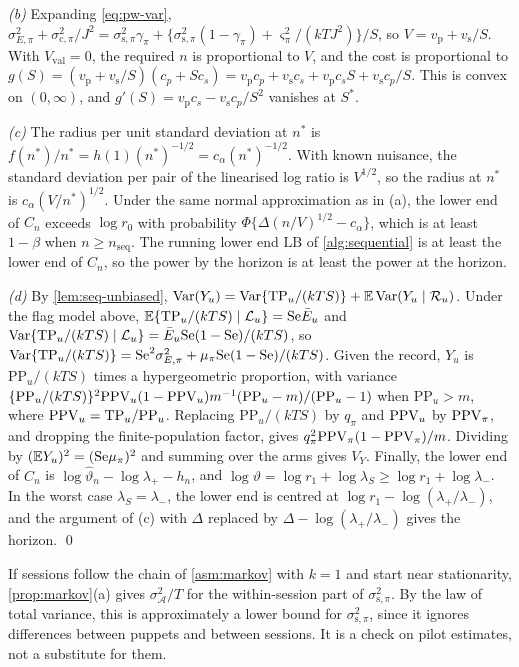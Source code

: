 \emph{(b)} Expanding \eqref{eq:pw-var}, $\sigma^2_{E,\pi}+\sigma^2_{\mathrm c,\pi}/J^2=\sigma^2_{\mathrm s,\pi}\gamma_\pi+\{\sigma^2_{\mathrm s,\pi}(1-\gamma_\pi)+\varsigma^2_\pi/(kTJ^2)\}/S$, so $V=v_{\mathrm p}+v_{\mathrm s}/S$. With $V_{\mathrm{val}}=0$, the required $n$ is proportional to $V$, and the cost is proportional to $g(S)=(v_{\mathrm p}+v_{\mathrm s}/S)(c_p+Sc_s)=v_{\mathrm p}c_p+v_{\mathrm s}c_s+v_{\mathrm p}c_sS+v_{\mathrm s}c_p/S$. This is convex on $(0,\infty)$, and $g'(S)=v_{\mathrm p}c_s-v_{\mathrm s}c_p/S^2$ vanishes at $S^\ast$.

\emph{(c)} The radius per unit standard deviation at $n^\ast$ is $f(n^\ast)/n^\ast=h(1)(n^\ast)^{-1/2}=c_\alpha(n^\ast)^{-1/2}$. With known nuisance, the standard deviation per pair of the linearised log ratio is $V^{1/2}$, so the radius at $n^\ast$ is $c_\alpha(V/n^\ast)^{1/2}$. Under the same normal approximation as in (a), the lower end of $C_n$ exceeds $\log r_0$ with probability $\Phi\{\Delta(n/V)^{1/2}-c_\alpha\}$, which is at least $1-\beta$ when $n\ge n_{\mathrm{seq}}$. The running lower end $\mathrm{LB}$ of \cref{alg:sequential} is at least the lower end of $C_n$, so the power by the horizon is at least the power at the horizon.

\emph{(d)} By \cref{lem:seq-unbiased}, $\operatorname{Var}(Y_u)=\operatorname{Var}\{\mathrm{TP}_u/(kTS)\}+\mathbb{E}\operatorname{Var}(Y_u\mid\mathcal R_u)$. Under the flag model above, $\mathbb{E}\{\mathrm{TP}_u/(kTS)\mid\mathcal L_u\}=\mathrm{Se}\bar E_u$ and $\operatorname{Var}\{\mathrm{TP}_u/(kTS)\mid\mathcal L_u\}=\bar E_u\mathrm{Se}(1-\mathrm{Se})/(kTS)$, so $\operatorname{Var}\{\mathrm{TP}_u/(kTS)\}=\mathrm{Se}^2\sigma^2_{E,\pi}+\mu_\pi\mathrm{Se}(1-\mathrm{Se})/(kTS)$. Given the record, $Y_u$ is $\mathrm{PP}_u/(kTS)$ times a hypergeometric proportion, with variance $\{\mathrm{PP}_u/(kTS)\}^2\mathrm{PPV}_u(1-\mathrm{PPV}_u)m^{-1}(\mathrm{PP}_u-m)/(\mathrm{PP}_u-1)$ when $\mathrm{PP}_u>m$, where $\mathrm{PPV}_u=\mathrm{TP}_u/\mathrm{PP}_u$. Replacing $\mathrm{PP}_u/(kTS)$ by $q_\pi$ and $\mathrm{PPV}_u$ by $\mathrm{PPV}_\pi$, and dropping the finite-population factor, gives $q_\pi^2\mathrm{PPV}_\pi(1-\mathrm{PPV}_\pi)/m$. Dividing by $(\mathbb{E} Y_u)^2=(\mathrm{Se}\mu_\pi)^2$ and summing over the arms gives $V_Y$. Finally, the lower end of $C_n$ is $\log\widehat\vartheta_n-\log\lambda_+-h_n$, and $\log\vartheta=\log r_1+\log\lambda_S\ge\log r_1+\log\lambda_-$. In the worst case $\lambda_S=\lambda_-$, the lower end is centred at $\log r_1-\log(\lambda_+/\lambda_-)$, and the argument of (c) with $\Delta$ replaced by $\Delta-\log(\lambda_+/\lambda_-)$ gives the horizon.
\qed

\begin{remark}\label{rem:pw-markov}
If sessions follow the chain of \cref{asm:markov} with $k=1$ and start near stationarity, \cref{prop:markov}(a) gives $\sigma^2_{\mathcal A}/T$ for the within-session part of $\sigma^2_{\mathrm s,\pi}$. By the law of total variance, this is approximately a lower bound for $\sigma^2_{\mathrm s,\pi}$, since it ignores differences between puppets and between sessions. It is a check on pilot estimates, not a substitute for them.
\end{remark}
